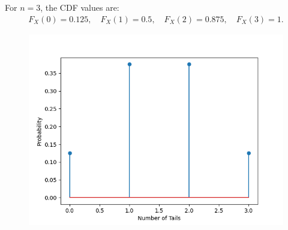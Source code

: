 \documentclass[journal]{IEEEtran}
\begin{document}
For \(n = 3\), the CDF values are:
\begin{align}
F_X(0) = 0.125, \quad F_X(1) = 0.5, \quad F_X(2) = 0.875, \quad F_X(3) = 1.
\end{align}
	\begin{figure}[h!]
		\centering
		\includegraphics[width=\columnwidth]{figs/fig1.png}
		\label{stemplot}
	\end{figure}
	
\end{document}
